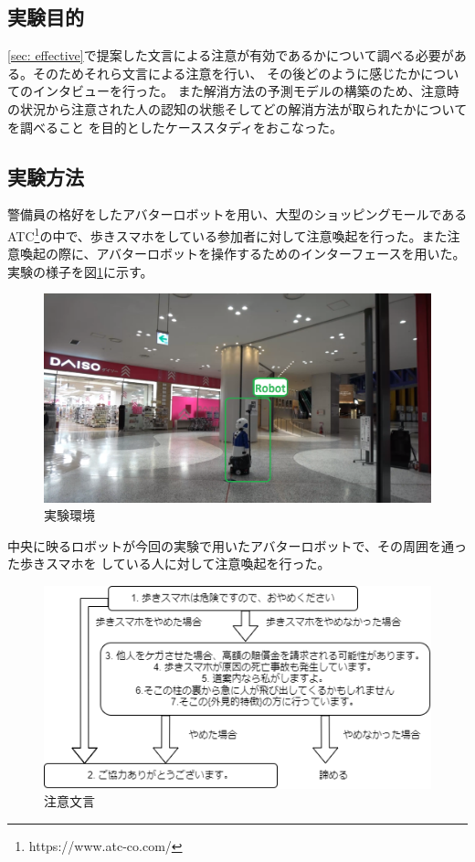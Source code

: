 \documentclass{kuisthesis}
\begin{document}
\subsection{実験目的}
\ref{sec: effective}で提案した文言による注意が有効であるかについて調べる必要がある。そのためそれら文言による注意を行い、
その後どのように感じたかについてのインタビューを行った。
また解消方法の予測モデルの構築のため、注意時の状況から注意された人の認知の状態そしてどの解消方法が取られたかについてを調べること
を目的としたケーススタディをおこなった。

\subsection{実験方法}
警備員の格好をしたアバターロボットを用い、大型のショッピングモールであるATC\footnote{https://www.atc-co.com/}の中で、歩きスマホをしている参加者に対して注意喚起を行った。また注意喚起の際に、アバターロボットを操作するためのインターフェースを用いた。
実験の様子を図\ref{fig: Experiment}に示す。
\begin{figure}[htbp]
  \includegraphics[width=15cm]{img/Experiment.png}
  \caption{実験環境}
  \label{fig: Experiment}
\end{figure}
中央に映るロボットが今回の実験で用いたアバターロボットで、その周囲を通った歩きスマホを
している人に対して注意喚起を行った。
\begin{figure}[h]
  \includegraphics[width=15cm]{img/waystostop.drawio.png}
  \caption{注意文言}
  \label{fig: Strategy}
\end{figure}
\end{document}
